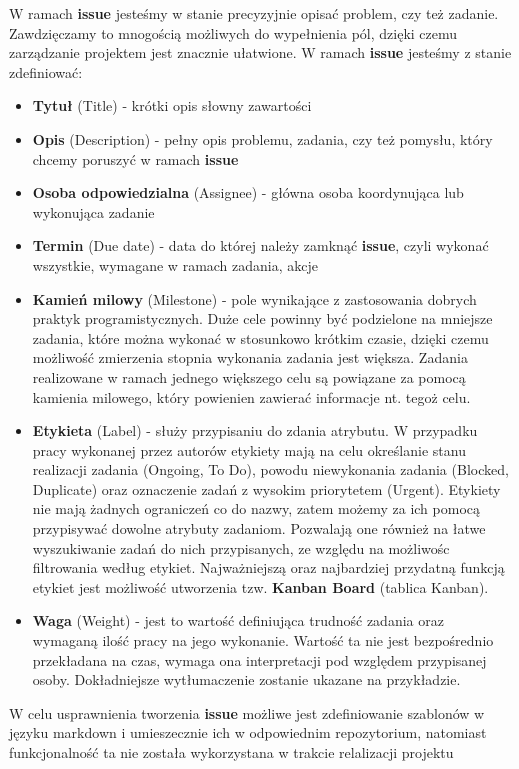 W ramach \textbf{issue} jesteśmy w stanie precyzyjnie opisać problem, czy też zadanie. Zawdzięczamy to mnogością możliwych do wypełnienia pól, dzięki czemu zarządzanie projektem jest znacznie ułatwione. W ramach \textbf{issue} jesteśmy z stanie zdefiniować:
\begin{itemize}
\item \textbf{Tytuł} (Title) - krótki opis słowny zawartości
\item \textbf{Opis} (Description) - pełny opis problemu, zadania, czy też pomysłu, który chcemy poruszyć w ramach \textbf{issue}
\item \textbf{Osoba odpowiedzialna} (Assignee) - główna osoba koordynująca lub wykonująca zadanie
\item \textbf{Termin} (Due date) - data do której należy zamknąć \textbf{issue}, czyli wykonać wszystkie, wymagane w ramach zadania, akcje
\item \textbf{Kamień milowy} (Milestone) - pole wynikające z zastosowania dobrych praktyk programistycznych. Duże cele powinny być podzielone na mniejsze zadania, które można wykonać w stosunkowo krótkim czasie, dzięki czemu możliwość zmierzenia stopnia wykonania zadania jest większa. Zadania realizowane w ramach jednego większego celu są powiązane za pomocą kamienia milowego, który powienien zawierać informacje nt. tegoż celu.
\item \textbf{Etykieta} (Label) - służy przypisaniu do zdania atrybutu. W przypadku pracy wykonanej przez autorów etykiety mają na celu określanie stanu realizacji zadania (Ongoing, To Do), powodu niewykonania zadania (Blocked, Duplicate) oraz oznaczenie zadań z wysokim priorytetem (Urgent). Etykiety nie mają żadnych ograniczeń co do nazwy, zatem możemy za ich pomocą przypisywać dowolne atrybuty zadaniom. Pozwalają one również na łatwe wyszukiwanie zadań do nich przypisanych, ze względu na możliwośc filtrowania według etykiet. Najważniejszą oraz najbardziej przydatną funkcją etykiet jest możliwość utworzenia tzw. \textbf{Kanban Board} (tablica Kanban).
\item \textbf{Waga} (Weight) - jest to wartość definiująca trudność zadania oraz wymaganą ilość pracy na jego wykonanie. Wartość ta nie jest bezpośrednio przekładana na czas, wymaga ona interpretacji pod względem przypisanej osoby. Dokładniejsze wytłumaczenie zostanie ukazane na przykładzie.
\end{itemize}

W celu usprawnienia tworzenia \textbf{issue} możliwe jest zdefiniowanie szablonów w języku markdown i umieszecznie ich w odpowiednim repozytorium, natomiast funkcjonalność ta nie została wykorzystana w trakcie relalizacji projektu

